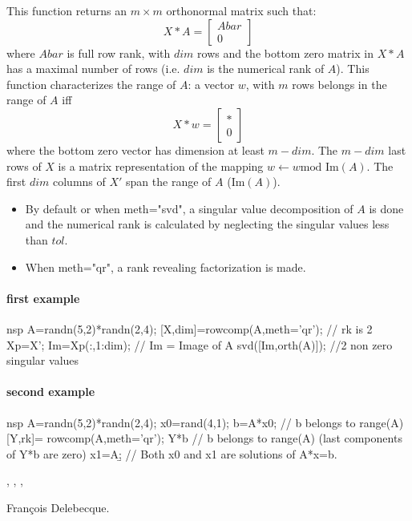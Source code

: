 \begin{mandescription}
This function returns an $m \times m$ orthonormal matrix such that:
$$
  X*A  = \left[ \begin{array}{c} Abar \\ 0 \end{array} \right] 
$$
where $Abar$ is full row rank, with $dim$ rows and the bottom zero matrix
in $X*A$ has a maximal number of rows (i.e. $dim$ is the numerical rank of $A$).
This function characterizes the range of $A$: a vector $w$, with $m$ rows
belongs in the range of $A$ iff 
$$
X*w  = \left[ \begin{array}{c} \ast \\ 0 \end{array} \right]
$$
where the bottom zero vector has dimension at least $m-dim$.
The $m-dim$ last rows of $X$ is a matrix representation of the mapping
$w \leftarrow w \text{mod Im} (A)$. 
The first $dim$ columns of $X'$ span the range of $A$ ($\text{Im}(A)$).
\begin{itemize}
\item By default or when  meth="svd", a singular value decomposition 
of $A$ is done and the numerical rank is calculated by 
neglecting the singular values less than $tol$.
\item When  meth="qr", a rank revealing factorization is made.
\end{itemize}
\end{mandescription}

\begin{examples}
\paragraph{first example}
  \begin{mintednsp}{nsp}
    A=randn(5,2)*randn(2,4);
    [X,dim]=rowcomp(A,meth='qr'); // rk is 2 
    Xp=X'; Im=Xp(:,1:dim); // Im = Image of A 
    svd([Im,orth(A)]); //2 non zero singular values
  \end{mintednsp}
\paragraph{second example}
  \begin{mintednsp}{nsp}
    A=randn(5,2)*randn(2,4);
    x0=rand(4,1); b=A*x0; // b belongs to range(A)  
    [Y,rk]= rowcomp(A,meth='qr');
    Y*b // b belongs to range(A) (last components of Y*b are zero)   
    x1=A\b;  // Both x0 and x1 are solutions of A*x=b.
  \end{mintednsp}
\end{examples}

\begin{manseealso}
  , , , 
\end{manseealso}

\begin{authors}
  Fran\c{c}ois Delebecque.
\end{authors}
